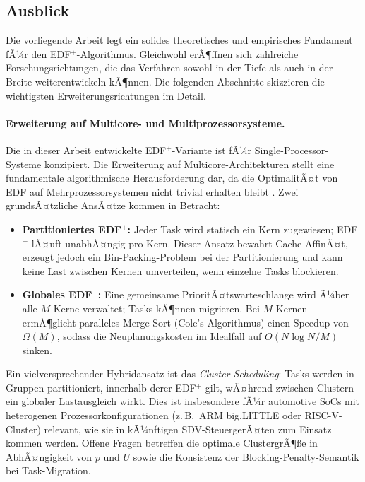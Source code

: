 ﻿\documentclass[a4paper,12pt]{article}
\theoremstyle{definition}
\begin{document}
	\subsection{Ausblick}

	Die vorliegende Arbeit legt ein solides theoretisches und empirisches Fundament fÃ¼r den
	EDF$^+$-Algorithmus. Gleichwohl erÃ¶ffnen sich zahlreiche Forschungsrichtungen, die das
	Verfahren sowohl in der Tiefe als auch in der Breite weiterentwickeln kÃ¶nnen.
	Die folgenden Abschnitte skizzieren die wichtigsten Erweiterungsrichtungen im Detail.

	\paragraph{Erweiterung auf Multicore- und Multiprozessorsysteme.}
	Die in dieser Arbeit entwickelte EDF$^+$-Variante ist fÃ¼r Single-Processor-Systeme
	konzipiert. Die Erweiterung auf Multicore-Architekturen stellt eine fundamentale
	algorithmische Herausforderung dar, da die OptimalitÃ¤t von EDF auf Mehrprozessorsystemen
	nicht trivial erhalten bleibt \cite{Buttazzo2011}. Zwei grundsÃ¤tzliche AnsÃ¤tze
	kommen in Betracht:
	\begin{itemize}
		\item \textbf{Partitioniertes EDF$^+$:} Jeder Task wird statisch ein Kern zugewiesen;
		      EDF$^+$ lÃ¤uft unabhÃ¤ngig pro Kern. Dieser Ansatz bewahrt Cache-AffinÃ¤t,
		      erzeugt jedoch ein Bin-Packing-Problem bei der Partitionierung und kann keine
		      Last zwischen Kernen umverteilen, wenn einzelne Tasks blockieren.
		\item \textbf{Globales EDF$^+$:} Eine gemeinsame PrioritÃ¤tswarteschlange wird Ã¼ber
		      alle $M$ Kerne verwaltet; Tasks kÃ¶nnen migrieren. Bei $M$ Kernen ermÃ¶glicht
		      paralleles Merge Sort (Cole\rq{}s Algorithmus) einen Speedup von $\Omega(M)$,
		      sodass die Neuplanungskosten im Idealfall auf $O(N \log N / M)$ sinken.
	\end{itemize}
	Ein vielversprechender Hybridansatz ist das \emph{Cluster-Scheduling}: Tasks werden in
	Gruppen partitioniert, innerhalb derer EDF$^+$ gilt, wÃ¤hrend zwischen Clustern ein
	globaler Lastausgleich wirkt. Dies ist insbesondere fÃ¼r automotive SoCs mit heterogenen
	Prozessorkonfigurationen (z.\,B.\ ARM big.LITTLE oder RISC-V-Cluster) relevant, wie sie
	in kÃ¼nftigen SDV-SteuergerÃ¤ten zum Einsatz kommen werden. Offene Fragen betreffen die
	optimale ClustergrÃ¶\ss{}e in AbhÃ¤ngigkeit von $p$ und $U$ sowie die Konsistenz der
	Blocking-Penalty-Semantik bei Task-Migration.
\end{document}
